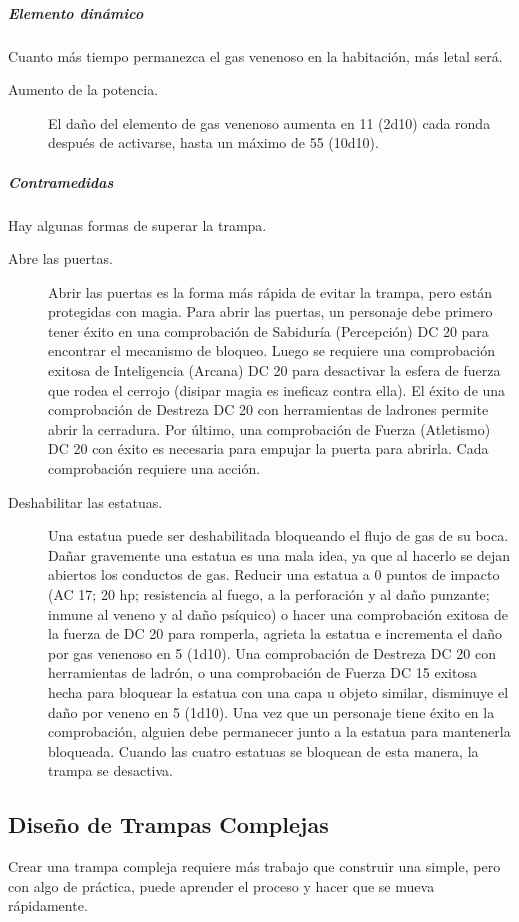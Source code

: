 \documentclass[a4paper,twocolumn,openany,10pt]{dndbook}
\begin{document}
\subparagraph{Elemento dinámico} Cuanto más tiempo permanezca el gas venenoso en la habitación, más letal será.

\begin{description}
	\item[Aumento de la potencia.] El daño del elemento de gas venenoso aumenta en 11 (2d10) cada ronda después de activarse,
	hasta un máximo de 55 (10d10). 
\end{description}

\subparagraph{Contramedidas} Hay algunas formas de superar la trampa. 
\begin{description}
	\item[Abre las puertas.] Abrir las puertas es la forma más rápida de evitar la trampa, pero están protegidas con magia. Para
	abrir las puertas, un personaje debe primero tener éxito en una comprobación de Sabiduría (Percepción) DC 20 para encontrar
	el mecanismo de bloqueo. Luego se requiere una comprobación exitosa de Inteligencia (Arcana) DC 20 para desactivar la esfera
	de fuerza que rodea el cerrojo (disipar magia es ineficaz contra ella). El éxito de una comprobación de Destreza DC 20 con
	herramientas de ladrones permite abrir la cerradura. Por último, una comprobación de Fuerza (Atletismo) DC 20 con éxito es
	necesaria para empujar la puerta para abrirla. Cada comprobación requiere una acción.

	\item[Deshabilitar las estatuas.] Una estatua puede ser deshabilitada bloqueando el flujo de gas de su boca. Dañar gravemente
	una estatua es una mala idea, ya que al hacerlo se dejan abiertos los conductos de gas. Reducir una estatua a 0 puntos de
	impacto (AC 17; 20 hp; resistencia al fuego, a la perforación y al daño punzante; inmune al veneno y al daño psíquico) o
	hacer una comprobación exitosa de la fuerza de DC 20 para romperla, agrieta la estatua e incrementa el daño por gas venenoso
	en 5 (1d10). Una comprobación de Destreza DC 20 con herramientas de ladrón, o una comprobación de Fuerza DC 15 exitosa hecha
	para bloquear la estatua con una capa u objeto similar, disminuye el daño por veneno en 5 (1d10). Una vez que un personaje
	tiene éxito en la comprobación, alguien debe permanecer junto a la estatua para mantenerla bloqueada. Cuando las cuatro
	estatuas se bloquean de esta manera, la trampa se desactiva.
\end{description}

\subsection{Diseño de Trampas Complejas}
Crear una trampa compleja requiere más trabajo que construir una simple, pero con algo de práctica, puede aprender el proceso y
hacer que se mueva rápidamente.
\end{document}
